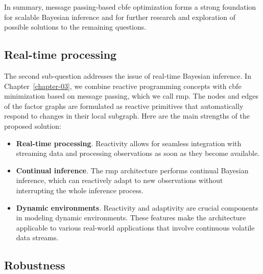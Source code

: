 In summary, message passing-based \ac{cbfe} optimization forms a strong foundation for scalable
Bayesian inference and for further research and exploration of possible solutions to the
remaining questions.

\subsection{Real-time processing}

\begin{questions}[resume] \item \reactivityquestion
  \label{question:contributions:reactivity}
\end{questions}

The second sub-question addresses the issue of real-time Bayesian inference.
In Chapter~\ref{chapter-03}, we combine reactive programming concepts with \ac{cbfe} minimization
based on message passing, which we call \acf{rmp}.
The nodes and edges of the factor graphs are formulated as reactive primitives that
automatically respond to changes in their local subgraph.
Here are the main strengths of the proposed solution:
\begin{itemize}
  \item \textbf{Real-time processing}.
        Reactivity allows for seamless integration with streaming data and processing observations as soon as they become available.
  \item \textbf{Continual inference}. The \ac{rmp} architecture performs continual Bayesian
        inference, which can reactively adapt to new observations without interrupting the whole inference process.
  \item \textbf{Dynamic environments}.
        Reactivity and adaptivity are crucial components in modeling dynamic environments. These features make the architecture applicable to various real-world applications that involve continuous volatile data streams.        
\end{itemize}


\subsection{Robustness}

\begin{questions}[resume] \item \robustnessquestion
  \label{question:contributions:robustness}
\end{questions}

